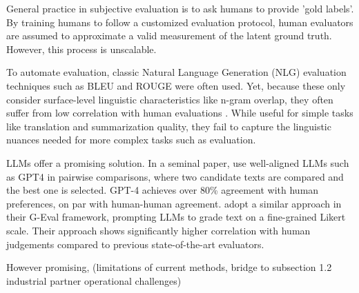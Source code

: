 General practice in subjective evaluation is to ask humans to provide 'gold labels'. By training humans to follow a customized evaluation protocol, human evaluators are assumed to approximate a valid measurement of the latent ground truth. However, this process is unscalable. 

To automate evaluation, classic Natural Language Generation (NLG) evaluation techniques such as BLEU and ROUGE were often used. Yet, because these only consider surface-level linguistic characteristics like n-gram overlap, they often suffer from low correlation with human evaluations \citep{liu_g-eval_2023}. While useful for simple tasks like translation and summarization quality, they fail to capture the linguistic nuances needed for more complex tasks such as evaluation.

LLMs offer a promising solution. In a seminal paper, \citet{zheng_judging_2023} use well-aligned LLMs such as GPT4 in pairwise comparisons, where two candidate texts are compared and the best one is selected. GPT-4 achieves over 80\% agreement with human preferences, on par with human-human agreement. \citet{liu_g-eval_2023} adopt a similar approach in their G-Eval framework, prompting LLMs to grade text on a fine-grained Likert scale. Their approach shows significantly higher correlation with human judgements compared to previous state-of-the-art evaluators. 

However promising, (limitations of current methods, bridge to subsection 1.2 industrial partner operational challenges)





